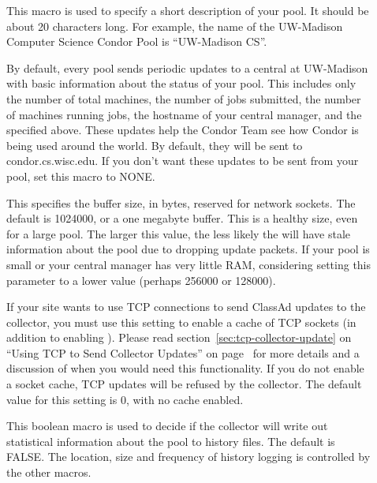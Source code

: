 \begin{description}
\item[] \label{param:CollectorName}
  This macro is used to specify a short description of your pool.
  It should be about 20 characters long.  For example, the name of the
  UW-Madison Computer Science Condor Pool is ``UW-Madison CS''.  

\item[]
  \label{param:CondorDevelopersCollector} By default, every pool sends
  periodic updates to a central  at UW-Madison with
  basic information about the status of your pool.  This includes only
  the number of total machines, the number of jobs submitted, the
  number of machines running jobs, the hostname of your central
  manager, and the  specified above.  These
  updates help the Condor Team see how Condor is being used around the world.
  By default, they will be sent to condor.cs.wisc.edu.  If you don't want
  these updates to be sent from your pool, set this macro to
  NONE. 

\item[] 
  \label{param:CollectorSocketBufsize} This specifies the buffer size, in
  bytes, reserved for  network sockets.  The default is
  1024000, or a one megabyte buffer.  This is a healthy size, even for a large
  pool.  The larger this value, the less likely the  will
  have stale information about the pool due to dropping update packets.  If
  your pool is small or your central manager has very little RAM, considering
  setting this parameter to a lower value (perhaps 256000 or 128000).

\item[] 
  \label{param:CollectorSocketCacheSize} 
  If your site wants to use TCP connections to send ClassAd updates to
  the collector, you must use this setting to enable a cache of TCP
  sockets (in addition to enabling
  ). 
  Please read section~\ref{sec:tcp-collector-update} on ``Using TCP to
  Send Collector Updates'' on page~\pageref{sec:tcp-collector-update}
  for more details and a discussion of when you would need this
  functionality. 
  If you do not enable a socket cache, TCP updates will be refused by
  the collector.
  The default value for this setting is 0, with no cache enabled.   

\item[] \label{param:KeepPoolHistory}
  This boolean macro is used to decide if the collector will write
  out statistical information about the pool to history files. The default
  is FALSE. The location, size and frequency of history logging is controlled
  by the other macros.


\end{description}
